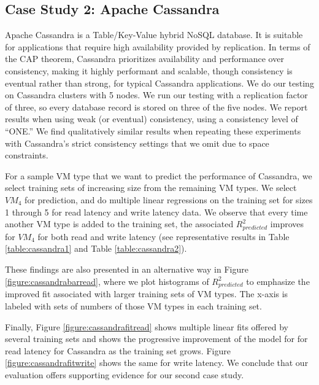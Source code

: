 \subsection{Case Study 2: Apache Cassandra}
\vspace{10pt}

Apache Cassandra is a Table/Key-Value hybrid NoSQL database.  It is suitable for applications that require high availability provided by replication.  In terms of the CAP theorem, Cassandra prioritizes availability and performance over consistency, making it highly performant and scalable, though consistency is eventual rather than strong, for typical Cassandra applications. %
We do our testing on Cassandra clusters with 5 nodes.  
We run our testing with a replication factor of three, so every database record is stored on three of the five nodes.  We report results when using weak (or eventual) consistency, using a consistency level of ``ONE.'' We find qualitatively similar results when repeating these experiments with Cassandra's strict consistency settings that we omit due to space constraints. 

For a sample VM type that we want to predict the performance of Cassandra, we select training sets of increasing size from the remaining VM types.  We select $VM_4$ for prediction, and do multiple linear regressions on the training set for sizes 1 through 5 for read latency and write latency data.  We observe that every time another VM type is added to the training set, the associated $R^2_{predicted}$ improves for $VM_4$ for both read and write latency (see representative results in Table \ref{table:cassandra1} and Table \ref{table:cassandra2}).

These findings are also presented in an alternative way in Figure \ref{figure:cassandrabarread}, %
where we plot histograms of $R^2_{predicted}$ to emphasize the improved fit associated with larger training sets of VM types.  The x-axis is labeled with sets of numbers of those VM types in each training set.

Finally, Figure \ref{figure:cassandrafitread} shows multiple linear fits offered by several training sets and shows the progressive improvement of the  model for for read latency for Cassandra as the training set grows. Figure \ref{figure:cassandrafitwrite} shows the same for write latency. We conclude that our evaluation offers supporting evidence for our second case study. 


